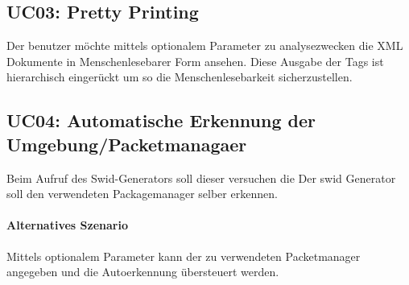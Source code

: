 \subsection*{UC03: Pretty Printing}
Der benutzer möchte mittels optionalem Parameter zu analysezwecken die XML Dokumente in Menschenlesebarer Form ansehen. Diese Ausgabe der Tags ist hierarchisch eingerückt um so die Menschenlesebarkeit sicherzustellen.

\subsection*{UC04: Automatische Erkennung der Umgebung/Packetmanagaer }
Beim Aufruf des Swid-Generators soll dieser versuchen die Der swid Generator soll den verwendeten Packagemanager selber erkennen.
\paragraph{Alternatives Szenario}
Mittels optionalem Parameter kann der zu verwendeten Packetmanager angegeben und die Autoerkennung übersteuert werden.


